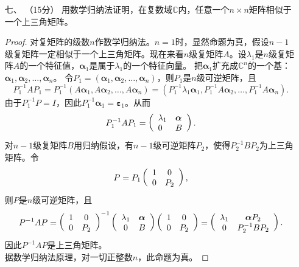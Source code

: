 \begin{enumerate}[1~]
\item[七、]（15分）
用数学归纳法证明，在复数域$\mathbb{C}$内，任意一个$n\times n$矩阵相似于一个上三角矩阵。
\begin{proof}
对复矩阵的级数$n$作数学归纳法。$n=1$时，显然命题为真，假设$n-1$级复矩阵一定相似于一个上三角矩阵。现在来看$n$级复矩阵$A$。设$\lambda_1$是$n$级复矩阵$A$的一个特征值，$\boldsymbol{\alpha} _ { 1 }$是属于$\lambda_1$的一个特征向量。
把$\boldsymbol{\alpha} _ { 1 }$扩充成$\mathbb{C}^n$的一个基：$\boldsymbol{\alpha} _ { 1 } , \boldsymbol{\alpha} _ { 2 } , \dots , \boldsymbol{\alpha} _ { n }$。
令$P_1=
\left( \boldsymbol{\alpha} _ { 1 } , \boldsymbol{\alpha} _ { 2 } , \dots , \boldsymbol{\alpha} _ { n } \right)$，则$P_1$是$n$级可逆矩阵，且\[
P _ { 1 } ^ { - 1 } A P _ { 1 } = P _ { 1 } ^ { - 1 } \left( A \boldsymbol{\alpha} _ { 1 } , A \boldsymbol{\alpha} _ { 2 } , \dots , A \boldsymbol{\alpha} _ { n } \right) = \left( P _ { 1 } ^ { - 1 } \lambda _ { 1 } \boldsymbol{\alpha} _ { 1 } , P _ { 1 } ^ { - 1 } A \boldsymbol{\alpha} _ { 2 } , \dots , P _ { 1 } ^ { - 1 } A \boldsymbol{\alpha} _ { n } \right).
\]
由于$P_1^{-1}P=I$，因此$P _ { 1 } ^ { - 1 } \boldsymbol{\alpha} _ { 1 } = \boldsymbol { \varepsilon } _ { 1 }$。从而\[
P _ { 1 } ^ { - 1 } A P _ { 1 } = \left( \begin{array} { l l } { \lambda _ { 1 } } & { \boldsymbol{\alpha} } \\ { 0 } & { B } \end{array} \right).
\]
对$n-1$级复矩阵$B$用归纳假设，有$n-1$级可逆矩阵$P_2$，使得$P_2^{-1}BP_2$为上三角矩阵。令\[
P = P _ { 1 } \left( \begin{array} { c c } { 1 } & { 0 } \\ { 0 } & { P _ { 2 } } \end{array} \right),
\]
则$P$是$n$级可逆矩阵，且\[
P ^ { - 1 } A P = \left( \begin{array} { c c } { 1 } & { 0 } \\ { 0 } & { P _ { 2 } } \end{array} \right) ^ { - 1 } \left( \begin{array} { c c } { \lambda _ { 1 } } & { \boldsymbol{\alpha} } \\ { 0 } & { B } \end{array} \right) \left( \begin{array} { c c } { 1 } & { 0 } \\ { 0 } & { P _ { 2 } } \end{array} \right) = \left( \begin{array} { c c } { \lambda _ { 1 } } & { \boldsymbol{\alpha} P _ { 2 } } \\ { 0 } & { P _ { 2 } ^ { - 1 } B P _ { 2 } } \end{array} \right).
\]
因此$P^{-1}AP$是上三角矩阵。\\
据数学归纳法原理，对一切正整数$n$，此命题为真。
\end{proof}



\end{enumerate}
\endinput